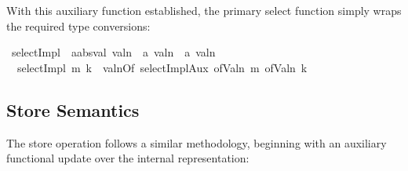 With this auxiliary function established, the primary select function simply wraps the required type conversions:

\begin{isabellebody}\isanewline
{}\isamarkupfalse%
\ selectImpl\ {\isacharcolon}{\kern0pt}{\isacharcolon}{\kern0pt}\ {\isachardoublequoteopen}{\isacharprime}{\kern0pt}a{\isacharcolon}{\kern0pt}{\isacharcolon}{\kern0pt}absval\ valn\ {\isasymRightarrow}\ {\isacharprime}{\kern0pt}a\ valn\ {\isasymRightarrow}\ {\isacharprime}{\kern0pt}a\ valn{\isachardoublequoteclose}\ \isanewline
\ \ {\isachardoublequoteopen}selectImpl\ m\ k\ {\isacharequal}{\kern0pt}\ valnOf\ {\isacharparenleft}{\kern0pt}selectImplAux\ {\isacharparenleft}{\kern0pt}ofValn\ m{\isacharparenright}{\kern0pt}\ {\isacharparenleft}{\kern0pt}ofValn\ k{\isacharparenright}{\kern0pt}{\isacharparenright}{\kern0pt}{\isachardoublequoteclose}%
\end{isabellebody}


\subsection{Store Semantics}
\label{sec:store}

The store operation follows a similar methodology, beginning with an auxiliary functional update over the internal representation:

